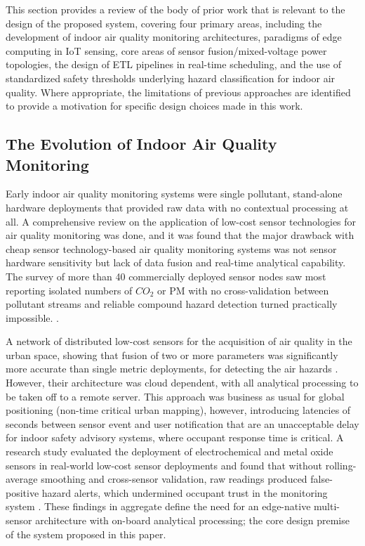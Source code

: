 \documentclass[conference]{IEEEtran}
\begin{document}
This section provides a review of the body of prior work that is relevant to the design of the proposed system, covering four primary areas, including the development of indoor air quality monitoring architectures, paradigms of edge computing in IoT sensing, core areas of sensor fusion/mixed-voltage power topologies, the design of ETL pipelines in real-time scheduling, and the use of standardized safety thresholds underlying hazard classification for indoor air quality. Where appropriate, the limitations of previous approaches are identified to provide a motivation for specific design choices made in this work.

\subsection{The Evolution of Indoor Air Quality Monitoring}

Early indoor air quality monitoring systems were single pollutant, stand-alone hardware deployments that provided raw data with no contextual processing at all. A comprehensive review on the application of low-cost sensor technologies for air quality monitoring was done, and it was found that the major drawback with cheap sensor technology-based air quality monitoring systems was not sensor hardware sensitivity but lack of data fusion and real-time analytical capability. The survey of more than 40 commercially deployed sensor nodes saw most reporting isolated numbers of $CO_2$ or PM with no cross-validation between pollutant streams and reliable compound hazard detection turned practically impossible. \cite{b3}.

A network of distributed low-cost sensors for the acquisition of air quality in the urban space, showing that fusion of two or more parameters was significantly more accurate than single metric deployments, for detecting the air hazards \cite{b4}. However, their architecture was cloud dependent, with all analytical processing to be taken off to a remote server. This approach was business as usual for global positioning (non-time critical urban mapping), however, introducing latencies of seconds between sensor event and user notification that are an unacceptable delay for indoor safety advisory systems, where occupant response time is critical. A research study evaluated the deployment of electrochemical and metal oxide sensors in real-world low-cost sensor deployments and found that without rolling-average smoothing and cross-sensor validation, raw readings produced false-positive hazard alerts, which undermined occupant trust in the monitoring system \cite{b5}. These findings in aggregate define the need for an edge-native multi-sensor architecture with on-board analytical processing; the core design premise of the system proposed in this paper.
\end{document}
